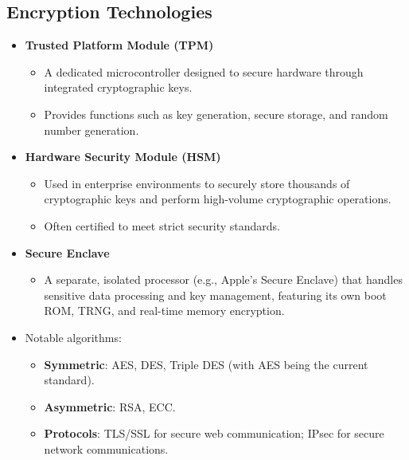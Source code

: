 \documentclass[11pt]{article}
\begin{document}
\subsection{Encryption Technologies}
\label{sec:org84850ac}
\begin{itemize}
\item \textbf{\textbf{Trusted Platform Module (TPM)}}
\begin{itemize}
\item A dedicated microcontroller designed to secure hardware through integrated cryptographic keys.
\item Provides functions such as key generation, secure storage, and random number generation.
\end{itemize}
\item \textbf{\textbf{Hardware Security Module (HSM)}}
\begin{itemize}
\item Used in enterprise environments to securely store thousands of cryptographic keys and perform high-volume cryptographic operations.
\item Often certified to meet strict security standards.
\end{itemize}
\item \textbf{\textbf{Secure Enclave}}
\begin{itemize}
\item A separate, isolated processor (e.g., Apple’s Secure Enclave) that handles sensitive data processing and key management, featuring its own boot ROM, TRNG, and real-time memory encryption.
\end{itemize}
\item Notable algorithms:
\begin{itemize}
\item \textbf{Symmetric}: AES, DES, Triple DES (with AES being the current standard).
\item \textbf{Asymmetric}: RSA, ECC.
\item \textbf{Protocols}: TLS/SSL for secure web communication; IPsec for secure network communications.
\end{itemize}
\end{itemize}
\end{document}
